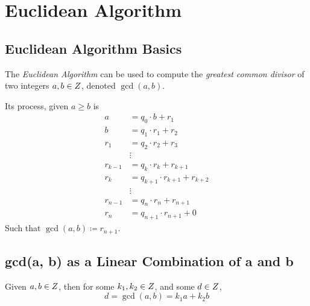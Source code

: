 \chapter{Euclidean Algorithm}

\section{Euclidean Algorithm Basics}

\begin{definition}
    The \textit{Euclidean Algorithm} can be used to compute the \textit{greatest common divisor} of two integers $a, b \in \relax{Z}$, denoted $\gcd(a, b)$.
    
    Its process, given $a \ge b$ is
    \begin{align}
        a           &= q_0 \cdot b + r_1 \\
        b           &= q_1 \cdot r_1 + r_2 \\
        r_1         &= q_2 \cdot r_2 + r_3 \\
                    &\vdots \nonumber \\
        r_{k - 1}   &= q_k \cdot r_k + r_{k + 1} \\
        r_k         &= q_{k + 1} \cdot r_{k + 1} + r_{k + 2} \\
                    &\vdots \nonumber \\
        r_{n - 1}   &= q_n \cdot r_n + r_{n + 1} \\
        r_n         &= q_{n + 1} \cdot r_{n + 1} + 0
    \end{align}
    Such that $\gcd(a, b) \coloneqq r_{n + 1}$.
\end{definition}

\section{gcd(a, b) as a Linear Combination of a and b}

\begin{proposition}
    Given $a, b \in \relax{Z}$, then for some $k_1, k_2 \in \relax{Z}$, and some $d \in \relax{Z}$,
    \begin{equation}
        d = \gcd(a, b) = k_1 a + k_2 b
    \end{equation}
\end{proposition}

